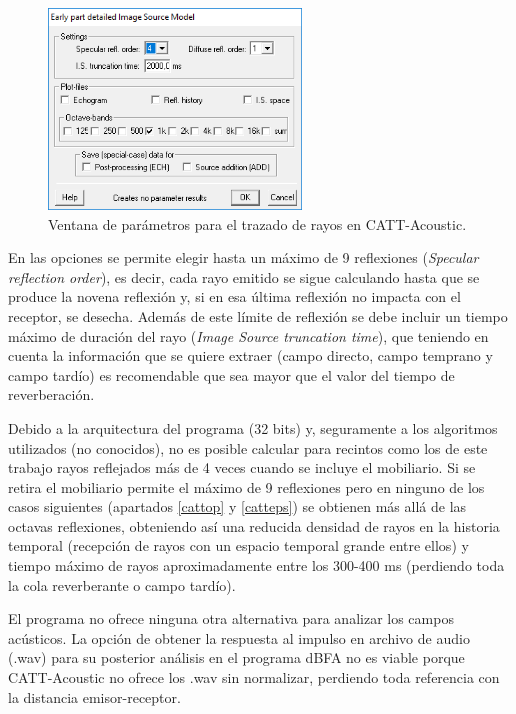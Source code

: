 \begin{figure}[H]
    \centering
    \includegraphics[width=0.6\textwidth]{archivos/capturas/ismcatt.png}
    \caption{Ventana de parámetros para el trazado de rayos en CATT-Acoustic.}
\end{figure}

En las opciones se permite elegir hasta un máximo de 9 reflexiones (\textit{Specular reflection order}), es decir, cada rayo emitido se sigue calculando hasta que se produce la novena reflexión y, si en esa última reflexión no impacta con el receptor, se desecha. Además de este límite de reflexión se debe incluir un tiempo máximo de duración del rayo (\textit{Image Source truncation time}), que teniendo en cuenta la información que se quiere extraer (campo directo, campo temprano y campo tardío) es recomendable que sea mayor que el valor del tiempo de reverberación.

Debido a la arquitectura del programa (32 bits) y, seguramente a los algoritmos utilizados (no conocidos), no es posible calcular para recintos como los de este trabajo rayos reflejados más de 4 veces cuando se incluye el mobiliario. Si se retira el mobiliario permite el máximo de 9 reflexiones pero en ninguno de los casos siguientes (apartados \ref{cattop} y \ref{catteps}) se obtienen más allá de las octavas reflexiones, obteniendo así una reducida densidad de rayos en la historia temporal (recepción de rayos con un espacio temporal grande entre ellos) y tiempo máximo de rayos aproximadamente entre los 300-400 ms (perdiendo toda la cola reverberante o campo tardío).

El programa no ofrece ninguna otra alternativa para analizar los campos acústicos. La opción de obtener la respuesta al impulso en archivo de audio (.wav) para su posterior análisis en el programa dBFA no es viable porque CATT-Acoustic no ofrece los .wav sin normalizar, perdiendo toda referencia con la distancia emisor-receptor.

